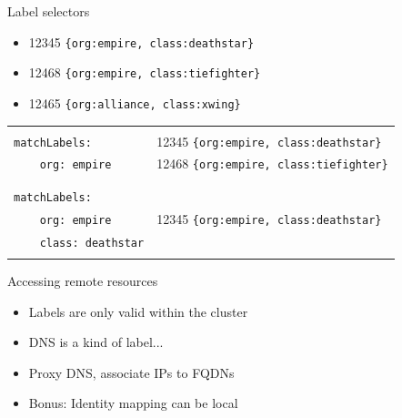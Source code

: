 \documentclass[black,white]{beamer}
\DeclareRobustCommand{\#}{\adjustbox{valign=B,totalheight=.57\baselineskip}{\oldhash}}%
\begin{document}
    \begin{frame}[fragile]{Label selectors}
        \vfill
        \begin{itemize}
            \item 12345 \verb+{org:empire, class:deathstar}+ \smallskip
            \item 12468 \verb+{org:empire, class:tiefighter}+ \smallskip
            \item 12465 \verb+{org:alliance, class:xwing}+ \smallskip
        \end{itemize}
        \vfill
        \begin{tabularx}{\textwidth}{l|l}
            \hline
            & \\
            \verb+matchLabels:+ & 12345 \verb+{org:empire, class:deathstar}+ \\
            \verb+    org: empire+ & 12468 \verb+{org:empire, class:tiefighter}+ \\
            & \\
            \hline
            & \\
            \verb+matchLabels:+ & \\
            \verb+    org: empire+ & 12345 \verb+{org:empire, class:deathstar}+ \\
            \verb+    class: deathstar+ & \\
            & \\
            \hline
        \end{tabularx}
        \vfill
    \end{frame}

    \begin{frame}{Accessing remote resources}
        \begin{itemize}
            \item Labels are only valid within the cluster \medskip
            \item DNS is a kind of label... \medskip
            \item Proxy DNS, associate IPs to FQDNs \medskip
            \item Bonus: Identity mapping can be local \medskip
        \end{itemize}
    \end{frame}
\end{document}
